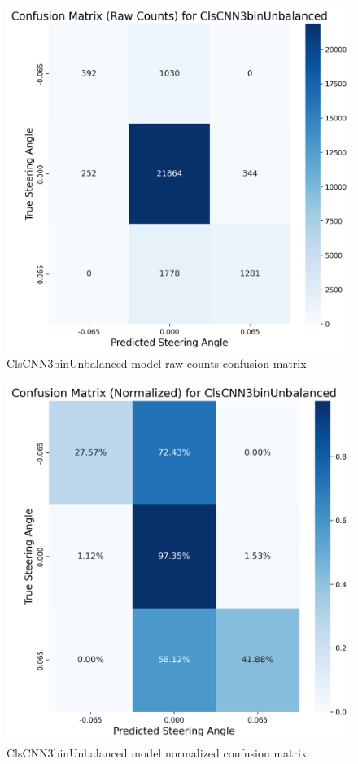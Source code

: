 \begin{figure}[H]
\centering
\includegraphics[width=0.65\linewidth]{Figures/Results/cm_raw_ClsCNN3binUnbalanced.png}
\caption{ClsCNN3binUnbalanced model raw counts confusion matrix}
\label{fig:cm_raw_ClsCNN3binUnbalanced}
\end{figure}


\begin{figure}[H]
\centering
\includegraphics[width=0.65\linewidth]{Figures/Results/cm_norm_ClsCNN3binUnbalanced.png}
\caption{ClsCNN3binUnbalanced model normalized confusion matrix}
\label{fig:cm_norm_ClsCNN3binUnbalanced}
\end{figure}


